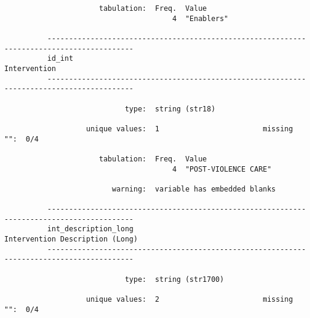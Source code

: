 \documentclass{article}
\begin{document}
\begin{verbatim}
                      tabulation:  Freq.  Value
                                       4  "Enablers"
          
          ------------------------------------------------------------------------------------------
          id_int                                                                        Intervention
          ------------------------------------------------------------------------------------------
          
                            type:  string (str18)
          
                   unique values:  1                        missing "":  0/4
          
                      tabulation:  Freq.  Value
                                       4  "POST-VIOLENCE CARE"
          
                         warning:  variable has embedded blanks
          
          ------------------------------------------------------------------------------------------
          int_description_long                                       Intervention Description (Long)
          ------------------------------------------------------------------------------------------
          
                            type:  string (str1700)
          
                   unique values:  2                        missing "":  0/4
          

\end{verbatim}
\end{document}
